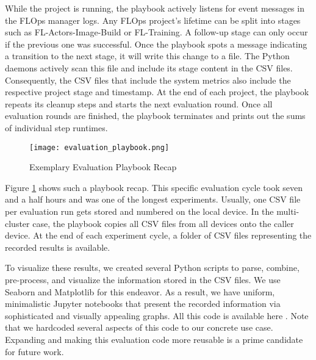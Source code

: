 While the project is running, the playbook actively listens for event messages in the FLOps manager logs.
Any FLOps project's lifetime can be split into stages such as FL-Actors-Image-Build or FL-Training.
A follow-up stage can only occur if the previous one was successful.
Once the playbook spots a message indicating a transition to the next stage, it will write this change to a file.
The Python daemons actively scan this file and include its stage content in the CSV files.
Consequently, the CSV files that include the system metrics also include the respective project stage and timestamp.
At the end of each project, the playbook repeats its cleanup steps and starts the next evaluation round.
Once all evaluation rounds are finished, the playbook terminates and prints out the sums of individual step runtimes. 
\begin{figure}[t]
        \centering
        \texttt{[image: evaluation\_playbook.png]}
        \caption{Exemplary Evaluation Playbook Recap}
        \label{fig:evaluation_playbook_result}
\end{figure}
Figure \ref{fig:evaluation_playbook_result} shows such a playbook recap.
This specific evaluation cycle took seven and a half hours and was one of the longest experiments.
Usually, one CSV file per evaluation run gets stored and numbered on the local device.
In the multi-cluster case, the playbook copies all CSV files from all devices onto the caller device.
At the end of each experiment cycle, a folder of CSV files representing the recorded results is available.

To visualize these results, we created several Python scripts to parse, combine, pre-process, and visualize the information stored in the CSV files.
We use Seaborn and Matplotlib for this endeavor.
As a result, we have uniform, minimalistic Jupyter notebooks that present the recorded information via sophisticated and visually appealing graphs.
All this code is available here \cite{cli_code}.
Note that we hardcoded several aspects of this code to our concrete use case.
Expanding and making this evaluation code more reusable is a prime candidate for future work.